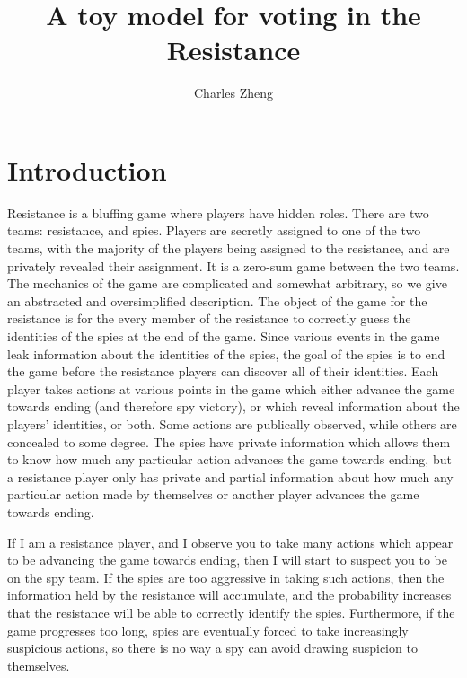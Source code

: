 \documentclass[11pt]{article}
\begin{document}
\newcommand{\tr}{\text{tr}}
\newcommand{\E}{\textbf{E}}
\newcommand{\diag}{\text{diag}}
\newcommand{\argmax}{\text{argmax}}
\newcommand{\argmin}{\text{argmin}}
\newcommand{\Cov}{\text{Cov}}
\newcommand{\Vol}{\text{Vol}}

\title{A toy model for voting in the Resistance}

\author{Charles Zheng}


\maketitle

\section{Introduction}

Resistance is a bluffing game where players have hidden roles.  There
are two teams: resistance, and spies.  Players are secretly assigned
to one of the two teams, with the majority of the players being
assigned to the resistance, and are privately revealed their
assignment.  It is a zero-sum game between the two teams.  The
mechanics of the game are complicated and somewhat arbitrary, so we
give an abstracted and oversimplified description.  The object of the
game for the resistance is for the every member of the resistance to
correctly guess the identities of the spies at the end of the game.
Since various events in the game leak information about the identities
of the spies, the goal of the spies is to end the game before the
resistance players can discover all of their identities.  Each player
takes actions at various points in the game which either advance the
game towards ending (and therefore spy victory), or which reveal
information about the players' identities, or both.  Some actions are
publically observed, while others are concealed to some degree.  The
spies have private information which allows them to know how much any
particular action advances the game towards ending, but a resistance
player only has private and partial information about how much any
particular action made by themselves or another player advances the
game towards ending.

If I am a resistance player, and I observe you to take many actions
which appear to be advancing the game towards ending, then I will
start to suspect you to be on the spy team.  If the spies are too
aggressive in taking such actions, then the information held by the
resistance will accumulate, and the probability increases that the
resistance will be able to correctly identify the spies.  Furthermore,
if the game progresses too long, spies are eventually forced to take
increasingly suspicious actions, so there is no way a spy can avoid
drawing suspicion to themselves.
\end{document}
